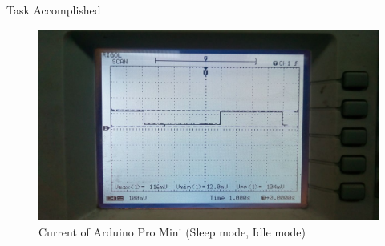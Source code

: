 \documentclass[10pt, a4paper]{beamer}
\begin{document}
\begin{frame}{Task Accomplished}
\begin{figure}
\begin{center}
\includegraphics[width=1\textwidth]{pro_mini_current_vtg_2.jpeg}
\caption{Current of Arduino Pro Mini (Sleep mode, Idle mode)}
\end{center}
\end{figure}
\end{frame}
\end{document}
